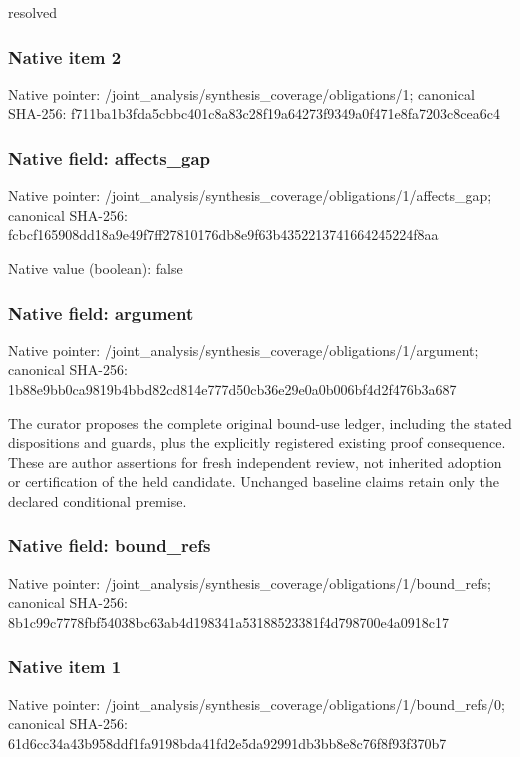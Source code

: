 \documentclass[10pt,a4paper]{article}
\begin{document}
\begingroup\raggedright\sloppy resolved\par\endgroup

\subsubsection{Native item 2}
Native pointer: /joint\_\allowbreak{}analysis/synthesis\_\allowbreak{}coverage/obligations/1; canonical SHA-256: f711ba1b3fda5cbbc401c8a83c28f19a64273f9349a0f471e8fa7203c8cea6c4

\subsubsection{Native field: affects\_\allowbreak{}gap}
Native pointer: /joint\_\allowbreak{}analysis/synthesis\_\allowbreak{}coverage/obligations/1/affects\_\allowbreak{}gap; canonical SHA-256: fcbcf165908dd18a9e49f7ff27810176db8e9f63b4352213741664245224f8aa

Native value (boolean): false

\subsubsection{Native field: argument}
Native pointer: /joint\_\allowbreak{}analysis/synthesis\_\allowbreak{}coverage/obligations/1/argument; canonical SHA-256: 1b88e9bb0ca9819b4bbd82cd814e777d50cb36e29e0a0b006bf4d2f476b3a687

\begingroup\raggedright\sloppy The curator proposes the complete original bound-use ledger,\allowbreak{} including the stated dispositions and guards,\allowbreak{} plus the explicitly registered existing proof consequence. These are author assertions for fresh independent review,\allowbreak{} not inherited adoption or certification of the held candidate. Unchanged baseline claims retain only the declared conditional premise.\par\endgroup

\subsubsection{Native field: bound\_\allowbreak{}refs}
Native pointer: /joint\_\allowbreak{}analysis/synthesis\_\allowbreak{}coverage/obligations/1/bound\_\allowbreak{}refs; canonical SHA-256: 8b1c99c7778fbf54038bc63ab4d198341a53188523381f4d798700e4a0918c17

\subsubsection{Native item 1}
Native pointer: /joint\_\allowbreak{}analysis/synthesis\_\allowbreak{}coverage/obligations/1/bound\_\allowbreak{}refs/0; canonical SHA-256: 61d6cc34a43b958ddf1fa9198bda41fd2e5da92991db3bb8e8c76f8f93f370b7
\end{document}
